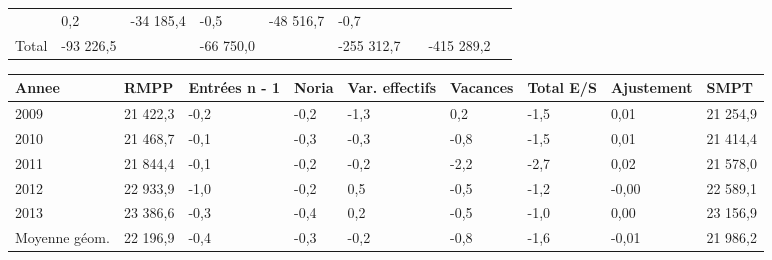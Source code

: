 \begin{longtable}[]{@{}lllllllll@{}}
\begin{minipage}[t]{0.16\columnwidth}
\end{minipage} & \begin{minipage}[t]{0.06\columnwidth}\raggedright
0,2\strut
\end{minipage} & \begin{minipage}[t]{0.12\columnwidth}\raggedright
-34 185,4\strut
\end{minipage} & \begin{minipage}[t]{0.06\columnwidth}\raggedright
-0,5\strut
\end{minipage} & \begin{minipage}[t]{0.09\columnwidth}\raggedright
-48 516,7\strut
\end{minipage} & \begin{minipage}[t]{0.06\columnwidth}\raggedright
-0,7\strut
\end{minipage}\tabularnewline
\begin{minipage}[t]{0.05\columnwidth}\raggedright
Total\strut
\end{minipage} & \begin{minipage}[t]{0.10\columnwidth}\raggedright
-93 226,5\strut
\end{minipage} & \begin{minipage}[t]{0.06\columnwidth}\raggedright
\strut
\end{minipage} & \begin{minipage}[t]{0.16\columnwidth}\raggedright
-66 750,0\strut
\end{minipage} & \begin{minipage}[t]{0.06\columnwidth}\raggedright
\strut
\end{minipage} & \begin{minipage}[t]{0.12\columnwidth}\raggedright
-255 312,7\strut
\end{minipage} & \begin{minipage}[t]{0.06\columnwidth}\raggedright
\strut
\end{minipage} & \begin{minipage}[t]{0.09\columnwidth}\raggedright
-415 289,2\strut
\end{minipage} & \begin{minipage}[t]{0.06\columnwidth}\raggedright
\strut
\end{minipage}\tabularnewline
\bottomrule
\end{longtable}

\begin{longtable}[]{@{}lllllllll@{}}
\toprule
Annee & RMPP & Entrées n - 1 & Noria & Var. effectifs & Vacances & Total
E/S & Ajustement & SMPT\tabularnewline
\midrule
\endhead
2009 & 21 422,3 & -0,2 & -0,2 & -1,3 & 0,2 & -1,5 & 0,01 & 21
254,9\tabularnewline
2010 & 21 468,7 & -0,1 & -0,3 & -0,3 & -0,8 & -1,5 & 0,01 & 21
414,4\tabularnewline
2011 & 21 844,4 & -0,1 & -0,2 & -0,2 & -2,2 & -2,7 & 0,02 & 21
578,0\tabularnewline
2012 & 22 933,9 & -1,0 & -0,2 & 0,5 & -0,5 & -1,2 & -0,00 & 22
589,1\tabularnewline
2013 & 23 386,6 & -0,3 & -0,4 & 0,2 & -0,5 & -1,0 & 0,00 & 23
156,9\tabularnewline
Moyenne géom. & 22 196,9 & -0,4 & -0,3 & -0,2 & -0,8 & -1,6 & -0,01 & 21
986,2\tabularnewline
\bottomrule
\end{longtable}

